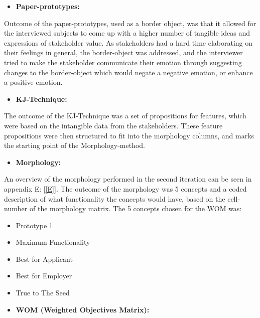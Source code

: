 \begin{itemize}
    \item \bf{Paper-prototypes:}
\end{itemize}

Outcome of the paper-prototypes, used as a border object, was that it allowed for the interviewed subjects to come up with a higher number of tangible ideas and expressions of stakeholder value. As stakeholders had a hard time elaborating on their feelings in general, the border-object was addressed, and the interviewer tried to make the stakeholder communicate their emotion through suggesting changes to the border-object which would negate a negative emotion, or enhance a positive emotion.

\begin{itemize}
    \item \bf{KJ-Technique:}
\end{itemize}

 The outcome of the KJ-Technique was a set of propositions for features, which were based on the intangible data from the stakeholders. These feature propositions were then structured to fit into the morphology columns, and marks the starting point of the Morphology-method.

\begin{itemize}
    \item \bf{Morphology:}
\end{itemize}

An overview of the morphology performed in the second iteration can be seen in appendix E: [\ref{E}]. The outcome of the morphology was 5 concepts and a coded description of what functionality the concepts would have, based on the cell-number of the morphology matrix. The 5 concepts chosen for the WOM was:

\begin{itemize}
    \item Prototype 1
    \item Maximum Functionality
    \item Best for Applicant
    \item Best for Employer
    \item True to The Seed
\end{itemize}

\newpage

\begin{itemize}
    \item \bf{WOM (Weighted Objectives Matrix):}
\end{itemize}

